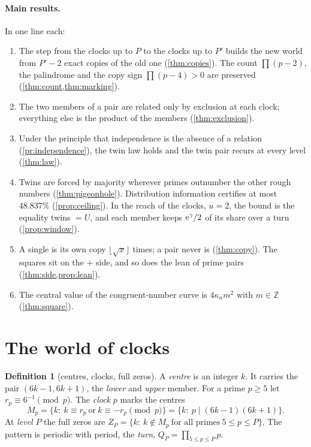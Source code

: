 \documentclass[11pt]{article}
\theoremstyle{definition}\newtheorem{definition}[theorem]{Definition}
\theoremstyle{remark}\newtheorem{remark}[theorem]{Remark}
\newcommand{\Z}{\mathbb Z}\newcommand{\N}{\mathbb N}
\begin{document}
\paragraph{Main results.} In one line each:
\begin{enumerate}[label=(\roman*)]
\item The step from the clocks up to $P$ to the clocks up to $P'$ builds the new world from $P'-2$ exact copies of the old one (\cref{thm:copies}). The count $\prod(p-2)$, the palindrome and the copy sign $\prod(p-4)>0$ are preserved (\cref{thm:count,thm:marking}).
\item The two members of a pair are related only by exclusion at each clock; everything else is the product of the members (\cref{thm:exclusion}).
\item Under the principle that independence is the absence of a relation (\cref{pr:independence}), the twin law holds and the twin pair recurs at every level (\cref{thm:law}).
\item Twins are forced by majority wherever primes outnumber the other rough numbers (\cref{thm:pigeonhole}). Distribution information certifies at most $48.837\%$ (\cref{prop:ceiling}). In the reach of the clocks, $u=2$, the bound is the equality twins $=U$, and each member keeps $\mathrm e^\gamma/2$ of its share over a turn (\cref{prop:window}).
\item A single is its own copy $\lfloor\sqrt x\rfloor$ times; a pair never is (\cref{thm:copy}). The squares sit on the $+$ side, and so does the lean of prime pairs (\cref{thm:side,prop:lean}).
\item The central value of the congruent-number curve is $4\kappa_n m^2$ with $m\in\Z$ (\cref{thm:square}).
\end{enumerate}

\section{The world of clocks}\label{sec:clocks}

\begin{definition}[centres, clocks, full zeros]\label{def:clocks}
A \emph{centre} is an integer $k$. It carries the pair $(6k-1,6k+1)$, the \emph{lower} and \emph{upper} member. For a prime $p\ge5$ let $r_p\equiv6^{-1}\pmod p$. The \emph{clock} $p$ marks the centres
\[
M_p=\{k:\ k\equiv r_p\ \text{or}\ k\equiv-r_p\pmod p\}=\{k:\ p\mid(6k-1)(6k+1)\}.
\]
At \emph{level} $P$ the full zeros are $Z_P=\{k:\ k\notin M_p\ \text{for all primes}\ 5\le p\le P\}$. The pattern is periodic with period, the \emph{turn}, $Q_P=\prod_{5\le p\le P}p$.
\end{definition}
\end{document}
